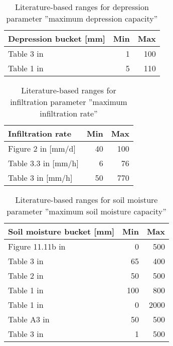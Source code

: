 \begin{table}[htbp]
  \centering
  \caption[References: Depression capacity]{Literature-based ranges for depression parameter ''maximum depression capacity''}
    \begin{tabular}{lrr}
    \toprule
    \textbf{Depression bucket [mm]} & \textbf{Min} & \textbf{Max} \\
    \midrule
    Table 3 in \cite{Chiew1994} & 1     & 100 \\
    Table 1  in \cite{Amoah2013} & 5     & 110 \\
    \bottomrule
    \end{tabular}%
  \label{tab:sm4_dep}%
\end{table}%

\begin{table}[htbp]
  \centering
  \caption[References: Infiltration rate]{Literature-based ranges for infiltration parameter ''maximum infiltration rate''}
    \begin{tabular}{lrr}
    \toprule
    \textbf{Infiltration rate } & \textbf{Min} & \textbf{Max} \\
    \midrule
    Figure 2 in \cite{Assouline2013} [mm/d] & 40    & 100 \\
    Table 3.3  in \cite{Jones1997} [mm/h] & 6     & 76 \\
    Table 3 in \cite{Cerda1996} [mm/h] & 50    & 770 \\
    \bottomrule
    \end{tabular}%
  \label{tab:sm4_inf}%
\end{table}%


\begin{table}[htbp]
  \centering
  \caption[References: Soil moisture capacity]{Literature-based ranges for soil moisture parameter ''maximum soil moisture capacity''}
    \begin{tabular}{lrr}
    \toprule
    \textbf{Soil moisture bucket [mm]} & \textbf{Min} & \textbf{Max} \\
    \midrule
    Figure 11.11b in \cite{Chiew2002} & 0     & 500 \\
    Table 3 in \cite{Chiew1994} & 65    & 400 \\
    Table 2 in \cite{Seibert1997} & 50    & 500 \\
    Table 1 in \cite{Rusli2015} & 100   & 800 \\
    Table 1 in \cite{Kollat2012} & 0     & 2000 \\
    Table A3 in \cite{Seibert2012} & 50    & 500 \\
    Table 3 in \cite{Sun2015} & 1     & 500 \\
    \bottomrule
    \end{tabular}%
  \label{tab:sm4_sm}%
\end{table}%

